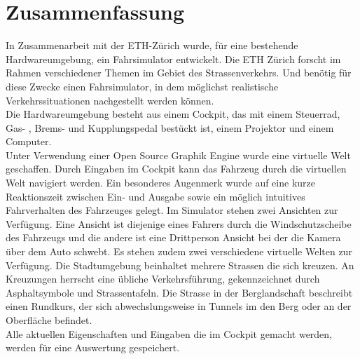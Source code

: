\section*{Zusammenfassung}
In Zusammenarbeit mit der ETH-Zürich wurde, für eine bestehende Hardwareumgebung, ein Fahrsimulator entwickelt. Die ETH Zürich forscht im Rahmen verschiedener Themen im Gebiet des Strassenverkehrs. Und benötig für diese Zwecke einen Fahrsimulator, in dem möglichst realistische Verkehrssituationen nachgestellt werden können. \\
Die Hardwareumgebung besteht aus einem Cockpit, das mit einem Steuerrad, Gas- , Brems- und Kupplungspedal bestückt ist, einem Projektor und einem Computer. \\
Unter Verwendung einer Open Source Graphik Engine wurde eine virtuelle Welt geschaffen. Durch Eingaben im Cockpit kann das Fahrzeug durch die virtuellen Welt navigiert werden. Ein besonderes Augenmerk wurde auf eine kurze Reaktionszeit zwischen Ein- und Ausgabe sowie ein möglich intuitives Fahrverhalten des Fahrzeuges gelegt. Im Simulator stehen zwei Ansichten zur Verfügung. Eine Ansicht ist diejenige eines Fahrers durch die Windschutzscheibe des Fahrzeugs und die andere ist eine Drittperson Ansicht bei der die Kamera über dem Auto schwebt. Es stehen zudem zwei verschiedene virtuelle Welten zur Verfügung. Die Stadtumgebung beinhaltet mehrere Strassen die sich kreuzen. An Kreuzungen herrscht eine übliche Verkehrsführung, gekennzeichnet durch Asphaltsymbole und Strassentafeln. Die Strasse in der Berglandschaft beschreibt einen Rundkurs, der sich abwechslungsweise in Tunnels im den Berg oder an der Oberfläche befindet.\\
Alle aktuellen Eigenschaften und Eingaben die im Cockpit gemacht werden, werden für eine Auswertung gespeichert. 
\newpage

